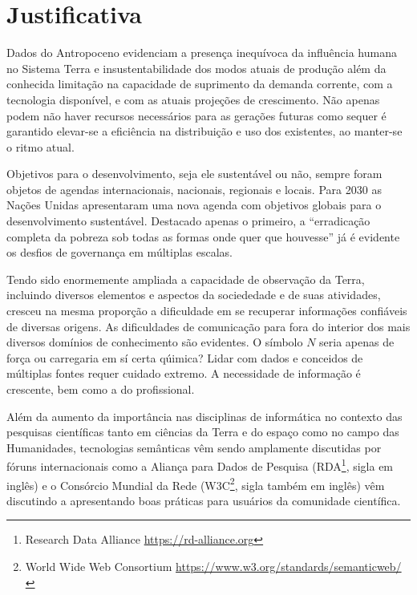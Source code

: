 \documentclass[
	11pt,				%
	openany,			%
	oneside,			%
	a4paper,			%
	english,			%
	french,				%
	spanish,			%
	brazil,				%
	]{abntex2}
\begin{document}
\chapter{Justificativa}

Dados do Antropoceno evidenciam a presença inequívoca da influência humana no Sistema Terra e insustentabilidade dos modos atuais de produção além da conhecida limitação na capacidade de suprimento da demanda corrente, com a tecnologia disponível, e com as atuais projeções de crescimento. Não apenas podem não haver recursos necessários para as gerações futuras como sequer é garantido elevar-se a eficiência na distribuição e uso dos existentes, ao manter-se o ritmo atual.

Objetivos para o desenvolvimento, seja ele sustentável ou não, sempre foram objetos de agendas internacionais, nacionais, regionais e locais. Para 2030 as Nações Unidas apresentaram uma nova agenda com objetivos globais para o desenvolvimento sustentável. Destacado apenas o primeiro, a ``erradicação completa da pobreza sob todas as formas onde quer que houvesse''\cite{united_nations_transforming_2015} já é evidente os desfios de governança em múltiplas escalas.

Tendo sido enormemente ampliada a capacidade de observação da Terra, incluindo diversos elementos e aspectos da sociededade e de suas atividades, cresceu na mesma proporção a dificuldade em se recuperar informações confiáveis de diversas origens. As dificuldades de comunicação para fora do interior dos mais diversos domínios de conhecimento são evidentes. O símbolo $N$ seria apenas de força ou carregaria em sí certa qúimica? Lidar com dados e conceidos de múltiplas fontes requer cuidado extremo. A necessidade de informação é crescente, bem como a do profissional.

Além da aumento da importância nas disciplinas de informática no contexto das pesquisas científicas tanto em ciências da Terra e do espaço como no campo das Humanidades, tecnologias semânticas vêm sendo amplamente discutidas por fóruns internacionais como a Aliança para Dados de Pesquisa (RDA\footnote{Research Data Alliance \url{https://rd-alliance.org}}, sigla em inglês) e o Consórcio Mundial da Rede (W3C\footnote{World Wide Web Consortium \url{https://www.w3.org/standards/semanticweb/}}, sigla também em inglês) vêm discutindo a apresentando boas práticas para usuários da comunidade científica.
\end{document}
